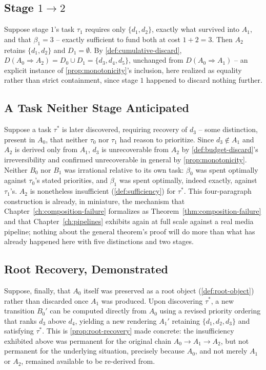 \subsection{Stage \texorpdfstring{$1 \to 2$}{1 to 2}}

Suppose stage $1$'s task $\tau_1$ requires only $\{d_1, d_2\}$, exactly
what survived into $A_1$, and that $\beta_1 = 3$ -- exactly sufficient to
fund both at cost $1 + 2 = 3$. Then $A_2$ retains $\{d_1, d_2\}$ and $D_1 =
\emptyset$. By \cref{def:cumulative-discard}, $D(A_0 \Rightarrow A_2) =
D_0 \cup D_1 = \{d_3, d_4, d_5\}$, unchanged from $D(A_0 \Rightarrow A_1)$
-- an explicit instance of \cref{prop:monotonicity}'s inclusion, here
realized as equality rather than strict containment, since stage $1$
happened to discard nothing further.

\subsection{A Task Neither Stage Anticipated}

Suppose a task $\tau^*$ is later discovered, requiring recovery of $d_3$
-- some distinction, present in $A_0$, that neither $\tau_0$ nor $\tau_1$
had reason to prioritize. Since $d_3 \notin A_1$ and $A_2$ is derived only
from $A_1$, $d_3$ is unrecoverable from $A_2$ by
\cref{def:budget-discard}'s irreversibility and confirmed unrecoverable in
general by \cref{prop:monotonicity}. Neither $B_0$ nor $B_1$ was
irrational relative to its own task: $\beta_0$ was spent optimally against
$\tau_0$'s stated priorities, and $\beta_1$ was spent optimally, indeed
exactly, against $\tau_1$'s. $A_2$ is nonetheless insufficient
(\cref{def:sufficiency}) for $\tau^*$. This four-paragraph construction is
already, in miniature, the mechanism that Chapter~\ref{ch:composition-failure}
formalizes as Theorem~\ref{thm:composition-failure} and that
Chapter~\ref{ch:pipelines} exhibits again at full scale against a real
media pipeline; nothing about the general theorem's proof will do more
than what has already happened here with five distinctions and two
stages.

\subsection{Root Recovery, Demonstrated}

Suppose, finally, that $A_0$ itself was preserved as a root object
(\cref{def:root-object}) rather than discarded once $A_1$ was produced.
Upon discovering $\tau^*$, a new transition $B_0'$ can be computed directly
from $A_0$ using a revised priority ordering that ranks $d_3$ above $d_4$,
yielding a new rendering $A_1'$ retaining $\{d_1, d_2, d_3\}$ and
satisfying $\tau^*$. This is \cref{prop:root-recovery} made concrete: the
insufficiency exhibited above was permanent for the original chain
$A_0 \to A_1 \to A_2$, but not permanent for the underlying situation,
precisely because $A_0$, and not merely $A_1$ or $A_2$, remained available
to be re-derived from.


